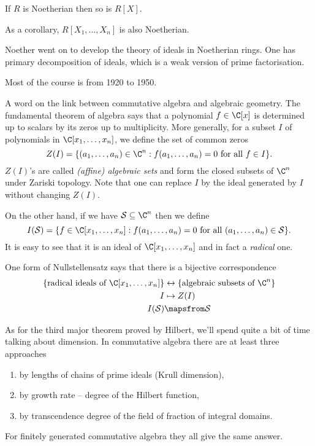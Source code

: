 \documentclass[a4paper]{article}
\begin{document}
\begin{theorem}
  If \(R\) is Noetherian then so is \(R[X]\).
\end{theorem}
As a corollary, \(R[X_1, \dots, X_n]\) is also Noetherian.

Noether went on to develop the theory of ideals in Noetherian rings. One has primary decomposition of ideals, which is a weak version of prime factorisation.

Most of the course is from 1920 to 1950.

A word on the link between commutative algebra and algebraic geometry. The fundamental theorem of algebra says that a polynomial \(f \in \C[x]\) is determined up to scalars by its zeros up to multiplicity. More generally, for a subset \(I\) of polynomials in \(\C[x_1, \dots, x_n]\), we define the set of common zeros
\[
  Z(I) = \{(a_1, \dots, a_n) \in \C^n: f(a_1, \dots, a_n) = 0 \text{ for all } f \in I\}.
\]
\(Z(I)\)'s are called \emph{(affine) algebraic sets} and form the closed subsets of \(\C^n\) under Zariski topology. Note that one can replace \(I\) by the ideal generated by \(I\) without changing \(Z(I)\).

On the other hand, if we have \(\mathcal S \subseteq \C^n\) then we define
\[
  I(\mathcal S) = \{f \in \C[x_1, \dots, x_n]: f(a_1, \dots, a_n) = 0 \text{ for all } (a_1, \dots, a_n) \in \mathcal S\}.
\]
It is easy to see that it is an ideal of \(\C[x_1, \dots, x_n]\) and in fact a \emph{radical} one.

One form of Nullstellensatz says that there is a bijective correspondence
\begin{align*}
  \{\text{radical ideals of } \C[x_1, \dots, x_n]\} &\leftrightarrow \{\text{algebraic subsets of } \C^n\} \\
  I &\mapsto Z(I) \\
  I(\mathcal S) &\mapsfrom \mathcal S
\end{align*}

As for the third major theorem proved by Hilbert, we'll spend quite a bit of time talking about dimension. In commutative algebra there are at least three approaches
\begin{enumerate}
\item by lengths of chains of prime ideals (Krull dimension),
\item by growth rate -- degree of the Hilbert function,
\item by transcendence degree of the field of fraction of integral domains.
\end{enumerate}
For finitely generated commutative algebra they all give the same answer.
\end{document}
